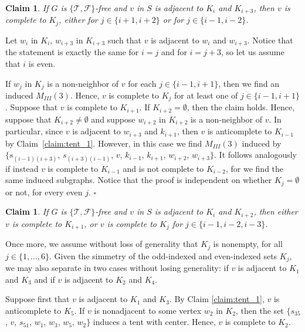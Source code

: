 \documentclass[12pt]{book}
\theoremstyle{plain}
\newtheorem{claim}[teo]{Claim}
\newcounter{cases}
\theoremstyle{remark}
\newcommand*{\QED}{\hfill\ensuremath{\square}}%
\begin{document}
	\begin{claim} \label{claim:tent_2}
		If $G$ is $\{ \mathcal{T}, \mathcal{F} \}$-free and $v$ in $S$ is adjacent to $K_i$ and $K_{i+3}$, then $v$ is complete to $K_j$, either for $j \in \{ i+1, i+2 \}$ or for $j \in \{ i-1, i-2\}$.
    \end{claim}

    Let $w_i$ in $K_i$, $w_{i+3}$ in $K_{i+3}$ such that $v$ is adjacent to $w_i$ and $w_{i+3}$. Notice that the statement is exactly the same for $i = j$ and for $i = j+3$, so let us assume that $i$ is even.

    If $w_j$ in $K_j$ is a non-neighbor of $v$ for each $j \in \{ i-1, i+1 \}$, then we find an induced $M_{III}(3)$. Hence, $v$ is complete to $K_j$ for at least one of $j \in \{i-1, i+1 \}$.
    Suppose that $v$ is complete to $K_{i+1}$. If $K_{i+2} = \emptyset$, then the claim holds. Hence, suppose that $K_{i+2} \neq \emptyset$ and suppose $w_{i+2}$ in $K_{i+2}$ is a non-neighbor of $v$. In particular, since $v$ is adjacent to $w_{i+3}$ and $k_{i+1}$, then $v$ is anticomplete to $K_{i-1}$ by Claim~\ref{claim:tent_1}. However, in this case we find $M_{III}(3)$ induced by $\{s_{(i-1)(i+3)}$, $s_{(i+3)(i-1)}$, $v$, $k_{i-1}$, $k_{i+1}$, $w_{i+2}$, $w_{i+3} \}$.
    It follows analogously if instead $v$ is complete to $K_{i-1}$ and is not complete to $K_{i-2}$, for we find the same induced subgraphs. Notice that the proof is independent on whether $K_j = \emptyset$ or not, for every even $j$. \QED
	
	\begin{claim} \label{claim:tent_3}
		If $G$ is $\{ \mathcal{T}, \mathcal{F} \}$-free and $v$ in $S$ is adjacent to $K_i$ and $K_{i+2}$, then either $v$ is complete to $K_{i+1}$, or $v$ is complete to $K_j$ for $j \in \{ i-1, i-2, i-3 \}$.
	\end{claim}
	
	Once more, we assume without loss of generality that $K_j$ is nonempty, for all $j \in \{1, \ldots, 6\}$. 
	Given the simmetry of the odd-indexed and even-indexed sets $K_j$, we may also separate in two cases without losing generality: if $v$ is adjacent to $K_1$ and $K_3$ and if $v$ is adjacent to $K_2$ and $K_4$.
	
	Suppose first that $v$ is adjacent to $K_1$ and $K_3$. By Claim \ref{claim:tent_1}, $v$ is anticomplete to $K_5$. 
	If $v$ is nonadjacent to some vertex $w_2$ in $K_2$, then the set $\{ s_{35}$, $v$,  $s_{51}$, $w_1$, $w_{3}$, $w_{5}$, $w_{2} \}$ induces a tent with center. Hence, $v$ is complete to $K_2$.
	
\end{document}
